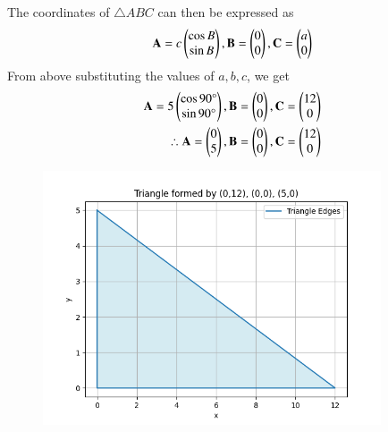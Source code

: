 \documentclass[journal]{IEEEtran}
\begin{document}
The coordinates of $\triangle ABC$ can then be expressed as
\begin{align}
    \mathbf{A} = c\begin{pmatrix}\cos{B} \\ \sin{B}\end{pmatrix}, \mathbf{B} = \begin{pmatrix}0 \\ 0\end{pmatrix}, \mathbf{C} = \begin{pmatrix}a \\ 0\end{pmatrix}
    \end{align}
    From above substituting the values of $a, b, c$, we get 
  \begin{align}
     \mathbf{A} = 5\begin{pmatrix}\cos{90\degree} \\ \sin{90\degree}\end{pmatrix}, \mathbf{B} = \begin{pmatrix}0 \\ 0\end{pmatrix}, \mathbf{C} = \begin{pmatrix} 12\\ 0\end{pmatrix} \\
    \therefore \mathbf{A} = \begin{pmatrix}0 \\ 5\end{pmatrix}, \mathbf{B} = \begin{pmatrix}0 \\ 0\end{pmatrix}, \mathbf{C} = \begin{pmatrix} 12\\ 0\end{pmatrix}   
\end{align}
\begin{figure}
    \centering
    \includegraphics[width=10cm]{figs/fig.png}
    \caption{}
    \label{fig:enter-label}
\end{figure}
\end{document}
